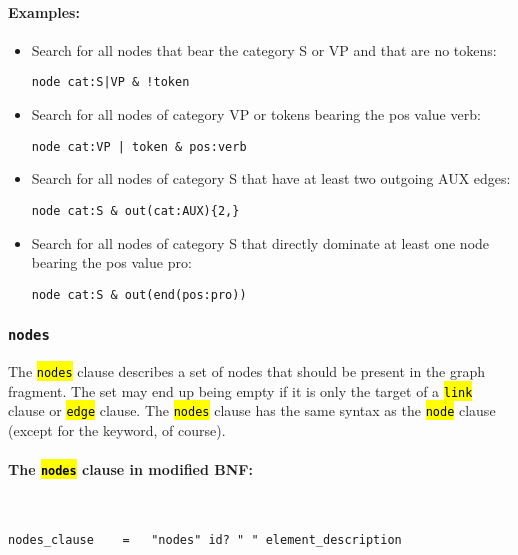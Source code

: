 \documentclass[12pt]{scrartcl}
\newcommand{\code}[1]{\hl{\texttt{#1}}}
\begin{document}
\paragraph*{Examples:}
\begin{itemize}
	\item Search for all nodes that bear the category S or VP and that are no tokens:
	\begin{lstlisting}[gobble=8,aboveskip=.6em,belowskip=.2em]
		node cat:S|VP & !token
	\end{lstlisting}
	\item Search for all nodes of category VP or tokens bearing the pos value verb:
	\begin{lstlisting}[gobble=8,aboveskip=.6em,belowskip=.2em]
		node cat:VP | token & pos:verb
	\end{lstlisting}
	\item Search for all nodes of category S that have at least two outgoing AUX edges:
	\begin{lstlisting}[gobble=8,aboveskip=.6em,belowskip=.2em]
		node cat:S & out(cat:AUX){2,}
	\end{lstlisting}
	\item Search for all nodes of category S that directly dominate at least one node bearing the pos value pro:
	\begin{lstlisting}[gobble=8,aboveskip=.6em,belowskip=.2em]
		node cat:S & out(end(pos:pro))
	\end{lstlisting}
\end{itemize}


\subsubsection{\texttt{nodes}}

The \code{nodes} clause describes a set of nodes that should be present in the graph fragment.
The set may end up being empty if it is only the target of a \code{link} clause or \code{edge} clause.
The \code{nodes} clause has the same syntax as the \code{node} clause (except for the keyword, of course).

\paragraph*{The \code{nodes} clause in modified BNF:}
~
\begin{lstlisting}
nodes_clause    =   "nodes" id? " " element_description
\end{lstlisting}
\end{document}
